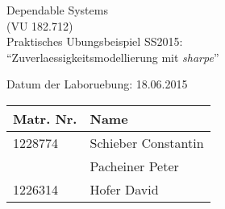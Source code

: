 \begin{titlepage}

\begin{center}
\vspace*{1.3cm}
{\Huge Dependable Systems\\(VU 182.712)\\}
\vspace{1.7cm}
{\LARGE Praktisches Ubungsbeispiel SS2015:\\``Zuverlaessigkeitsmodellierung mit \textit{sharpe}''\\}
\vspace{1.7cm}


{\hspace{1cm} Datum der Laboruebung: 18.06.2015}


\begin{table}[h!]
\centering
\begin{tabular}{|p{3.5cm}|p{6.5cm}|}
\hline \textbf{Matr. Nr.} & \textbf{Name} \\
\hline
1228774 &  Schieber Constantin \\
\hline
&  Pacheiner Peter \\
\hline
1226314 & Hofer David \\
\hline
\end{tabular}
\end{table}

\end{center}
\vspace{1.0cm}

\end{titlepage}
\setcounter{page}{2}




